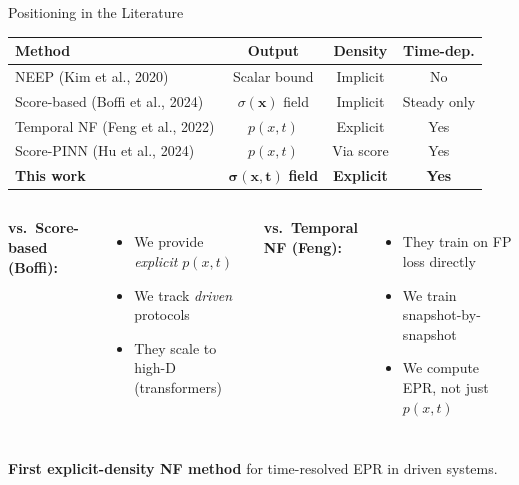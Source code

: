 \documentclass[aspectratio=169,11pt]{beamer}
\newcommand{\emphbox}[1]{\colorbox{blue!8}{\parbox{0.92\textwidth}{#1}}}
\begin{document}

\begin{frame}{Positioning in the Literature}

\centering
\begin{tabular}{l c c c}
\toprule
\textbf{Method} & \textbf{Output} & \textbf{Density} & \textbf{Time-dep.} \\
\midrule
NEEP (Kim et al., 2020) & Scalar bound & Implicit & No \\
Score-based (Boffi et al., 2024) & $\sigma(\mathbf{x})$ field & Implicit & Steady only \\
Temporal NF (Feng et al., 2022) & $p(x,t)$ & Explicit & Yes \\
Score-PINN (Hu et al., 2024) & $p(x,t)$ & Via score & Yes \\
\midrule
\textbf{This work} & $\boldsymbol{\sigma(x,t)}$ \textbf{field} & \textbf{Explicit} & \textbf{Yes} \\
\bottomrule
\end{tabular}

\vspace{0.8em}
\begin{columns}[T]
\textbf{vs.\ Score-based (Boffi):}
\begin{itemize}
    \item We provide \emph{explicit} $p(x,t)$
    \item We track \emph{driven} protocols
    \item They scale to high-D (transformers)
\end{itemize}

\textbf{vs.\ Temporal NF (Feng):}
\begin{itemize}
    \item They train on FP loss directly
    \item We train snapshot-by-snapshot
    \item We compute EPR, not just $p(x,t)$
\end{itemize}
\end{columns}

\vspace{0.3em}
\emphbox{
\centering
\textbf{First explicit-density NF method} for time-resolved EPR in driven systems.
}

\end{frame}

\end{document}
